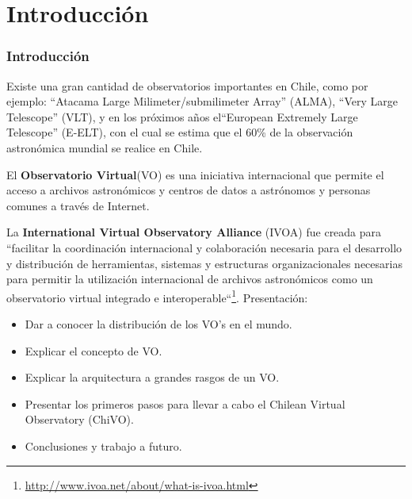 \section{Introducción}
\begin{frame}
\frametitle{Introducción}
Existe una gran cantidad de observatorios importantes en Chile, como por
ejemplo: ``Atacama Large Milimeter/submilimeter Array'' (ALMA), ``Very Large
Telescope'' (VLT), y en los próximos años el``European Extremely Large
Telescope'' (E-ELT), con el cual se estima que el 60\% de la observación
astronómica mundial se realice en Chile.  
\newline

El \textbf{Observatorio Virtual}(VO) es una iniciativa internacional que permite el
acceso a archivos astronómicos y centros de datos a astrónomos y personas
comunes a través de Internet. 

\end{frame}

\begin{frame}
La \textbf{International Virtual Observatory Alliance} (IVOA) fue creada para
``facilitar la coordinación internacional y colaboración necesaria para el
desarrollo y distribución de herramientas, sistemas y estructuras
organizacionales necesarias para permitir la utilización internacional de
archivos astronómicos como un observatorio virtual integrado e
interoperable``\footnote{\url{http://www.ivoa.net/about/what-is-ivoa.html}}.
\newline
\newline
Presentación:
\begin{itemize}
\setlength{\itemindent}{0.5cm}
    \item Dar a conocer la distribución de los VO's en el mundo.
    \item Explicar el concepto de VO.
    \item Explicar la arquitectura a grandes rasgos de un
        VO.
    \item Presentar los primeros pasos para llevar a cabo el
        Chilean Virtual Observatory (ChiVO).
    \item Conclusiones y trabajo a futuro.
\end{itemize}

\end{frame}
